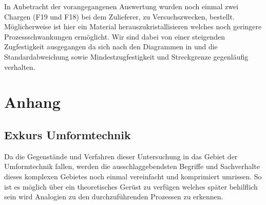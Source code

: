 \documentclass[12pt,a4paper,parskip,twoside,BCOR5mm,headsepline]{scrartcl}
\begin{document}
\begin{description*}
{In Anbetracht der vorangegangenen Auswertung wurden noch einmal zwei Chargen (F19 und F18) bei dem Zulieferer, zu Versuchszwecken, bestellt. Möglicherweise ist hier ein Material herauszukristallisieren welches noch geringere Prozessschwankungen ermöglicht. Wir sind dabei von einer steigenden Zugfestigkeit ausgegangen da sich nach den Diagrammen in  und  die Standardabweichung sowie Mindestzugfestigkeit und Streckgrenze gegenläufig verhalten.


 











\newpage
\section{Anhang}
\subsection{Exkurs Umformtechnik}


Da die Gegenstände und Verfahren dieser Untersuchung in das Gebiet der Umformtechnik fallen, werden die ausschlaggebendsten Begriffe und Sachverhalte dieses komplexen Gebietes noch einmal vereinfacht und komprimiert umrissen. So ist es möglich über ein theoretisches Gerüst zu verfügen welches später behilflich sein wird   Analogien zu den durchzuführenden Prozessen zu erkennen.
}
\end{description*}
\end{document}
